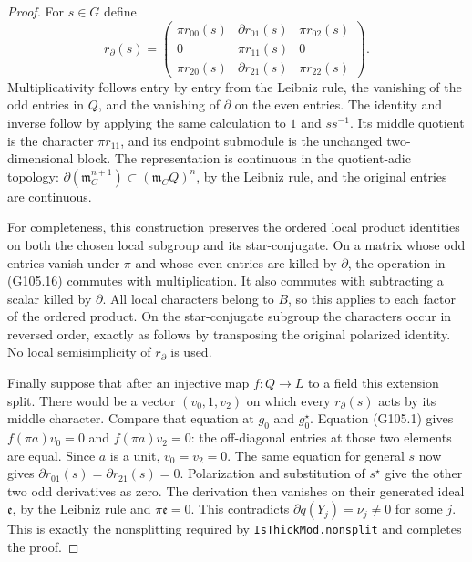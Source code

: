 \begin{proof}
For \(s\in G\) define
\[
 r_\partial(s)=
 \begin{pmatrix}
 \pi r_{00}(s)&\partial r_{01}(s)&\pi r_{02}(s)\\
 0&\pi r_{11}(s)&0\\
 \pi r_{20}(s)&\partial r_{21}(s)&\pi r_{22}(s)
 \end{pmatrix}.
 \tag{G105.16}
\]
Multiplicativity follows entry by entry from the
Leibniz rule, the vanishing of the odd entries in
\(Q\), and the vanishing of \(\partial\) on the
even entries.  The identity and inverse follow by
applying the same calculation to \(1\) and
\(ss^{-1}\).  Its middle quotient is the character
\(\pi r_{11}\), and its endpoint submodule is the
unchanged two-dimensional block.  The representation
is continuous in the quotient-adic topology:
\(\partial(\mathfrak m_C^{n+1})\subset
(\mathfrak m_CQ)^n\), by the Leibniz rule, and the
original entries are continuous.

For completeness, this construction preserves the
ordered local product identities on both the chosen
local subgroup and its star-conjugate.  On a matrix
whose odd entries vanish under \(\pi\) and whose
even entries are killed by \(\partial\), the
operation in (G105.16) commutes with multiplication.
It also commutes with subtracting a scalar killed
by \(\partial\).  All local characters belong to
\(B\), so this applies to each factor of the
ordered product.  On the star-conjugate subgroup
the characters occur in reversed order, exactly
as follows by transposing the original polarized
identity.  No local semisimplicity of
\(r_\partial\) is used.

Finally suppose that after an injective map
\(f:Q\to L\) to a field this extension split.
There would be a vector \((v_0,1,v_2)\) on which
every \(r_\partial(s)\) acts by its middle
character.  Compare that equation at \(g_0\)
and \(g_0^\star\).  Equation (G105.1) gives
\(f(\pi a)v_0=0\) and \(f(\pi a)v_2=0\):
the off-diagonal entries at those two elements
are equal.  Since \(a\) is a unit, \(v_0=v_2=0\).
The same equation for general \(s\) now gives
\(\partial r_{01}(s)=\partial r_{21}(s)=0\).
Polarization and substitution of \(s^\star\)
give the other two odd derivatives as zero.
The derivation then vanishes on their generated
ideal \(\mathfrak e\), by the Leibniz rule and
\(\pi\mathfrak e=0\).  This contradicts
\(\partial q(Y_j)=\nu_j\ne0\) for some \(j\).
This is exactly the nonsplitting required by
\texttt{IsThickMod.nonsplit} and completes the proof.
\end{proof}

